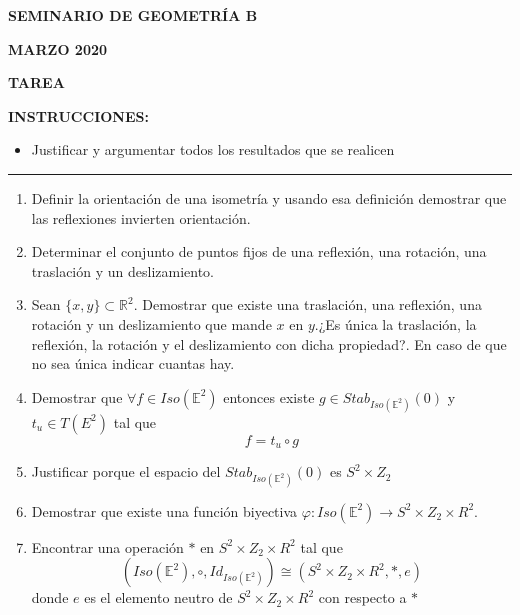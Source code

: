\documentclass[12pts]{report}
\newcommand{\R}{\mathbb R}
\newcommand{\E}{\mathbb E}
\begin{document}
\begin{center}
\textbf{\LARGE {SEMINARIO DE GEOMETRÍA B}}
\end{center}

\begin{center}
\textbf{\large MARZO 2020}\\
\end{center}

\begin{center}
\textbf{{\large TAREA}}
\end{center}

{\bf INSTRUCCIONES: }
\begin{itemize}
\item Justificar y argumentar todos los resultados que se realicen
\end{itemize}

\begin{center}
\rule[0mm]{20cm}{0.2mm}
\end{center}

\begin{enumerate}
\item Definir la orientación de una isometría y  usando esa definición demostrar que las reflexiones invierten orientación.

\item Determinar el conjunto de puntos fijos de una reflexión, una rotación, una traslación y un deslizamiento.

\item Sean $\{x, y\}\subset \R^2$. Demostrar que existe una traslación, una reflexión, una rotación y un deslizamiento que mande $x$ en $y$.¿Es única la traslación, la reflexión, la rotación y el deslizamiento con dicha propiedad?. En caso de que no sea única indicar cuantas hay.

\item Demostrar que $\forall f\in Iso(\E^2)$ entonces existe $g\in Stab_{Iso(\E^2)}(0)$ y $t_u \in T(E^2)$ tal que
$$f= t_u \circ g$$

\item Justificar porque el espacio del $ Stab_{Iso(\E^2)}(0)$ es $S^2 \times Z_2$

\item Demostrar que existe una función biyectiva $\varphi: Iso(\E^2) \to S^2 \times Z_2 \times R^2$.

\item Encontrar una operación $*$ en $S^2 \times Z_2 \times R^2$ tal que 
$$(Iso(\E^2), \circ, Id_{Iso(\E^2)}) \cong( S^2 \times Z_2 \times R^2, *, e)$$
donde $e$ es el elemento neutro de $S^2 \times Z_2 \times R^2$ con respecto a $*$
\end{enumerate}
\end{document}
